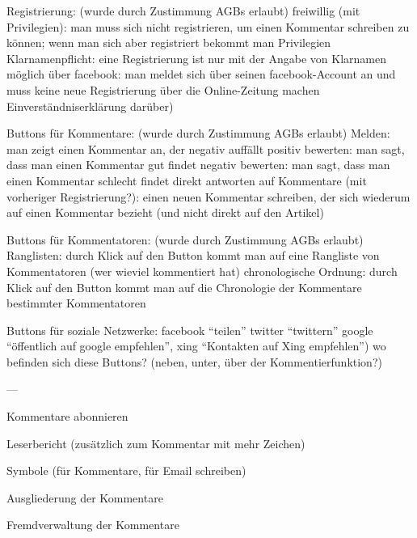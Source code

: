Registrierung:  (wurde durch Zustimmung AGBs erlaubt)
	 freiwillig (mit Privilegien): man muss sich nicht registrieren, um einen Kommentar schreiben zu können; wenn man sich aber registriert bekommt man Privilegien 
	 Klarnamenpflicht: eine Registrierung ist nur mit der Angabe von Klarnamen möglich
	 über facebook: man meldet sich über seinen facebook-Account an und muss keine neue Registrierung über die Online-Zeitung machen
	 Einverständniserklärung darüber)

Buttons für Kommentare: (wurde durch Zustimmung AGBs erlaubt)
	Melden: man zeigt einen Kommentar an, der negativ auffällt
	positiv bewerten: man sagt, dass man einen Kommentar gut findet
	negativ bewerten: man sagt, dass man einen Kommentar schlecht findet
	direkt antworten auf Kommentare (mit vorheriger Registrierung?): einen neuen Kommentar schreiben, der sich wiederum auf einen Kommentar bezieht (und nicht 														direkt auf den Artikel)

Buttons für Kommentatoren:  (wurde durch Zustimmung AGBs erlaubt)
	Ranglisten: durch Klick auf den Button kommt man auf eine Rangliste von Kommentatoren (wer wieviel kommentiert hat)
	chronologische Ordnung: durch Klick auf den Button kommt man auf die Chronologie der Kommentare bestimmter Kommentatoren

Buttons für soziale Netzwerke:
	facebook ``teilen''
	twitter ``twittern''
	google ``öffentlich auf google empfehlen'', 
	xing ``Kontakten auf Xing empfehlen'')
	wo befinden sich diese Buttons? (neben, unter, über der Kommentierfunktion?)


---

Kommentare abonnieren 

Leserbericht (zusätzlich zum Kommentar mit mehr Zeichen) 



Symbole (für Kommentare, für Email schreiben)

Ausgliederung der Kommentare

Fremdverwaltung der Kommentare
